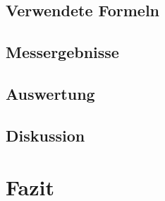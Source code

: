 \documentclass[12pt,a4paper]{article}
\begin{document}
\subsection{Verwendete Formeln}
\subsection{Messergebnisse}
\subsection{Auswertung}
\subsection{Diskussion}
\section{Fazit}
\end{document}
